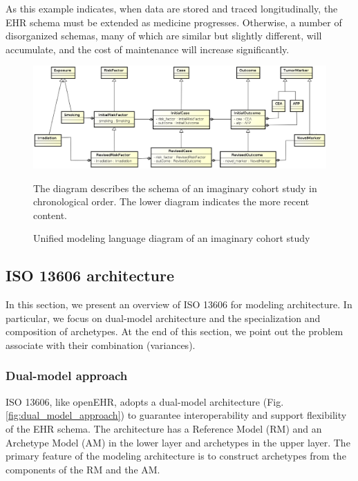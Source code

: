 \documentclass[preprint,3p,onecolumn,times,review]{elsarticle}
\begin{document}
As this example indicates, when data are stored and traced longitudinally, the EHR schema must be extended as medicine progresses. Otherwise, a number of disorganized schemas, many of which are similar but slightly different, will accumulate, and the cost of maintenance will increase significantly.


\begin{figure}[!htbp]
  \begin{center}
    \includegraphics[width=14cm]{cancer_cohort_study_schema.eps}  
  \end{center}
  \caption{Unified modeling language diagram of an imaginary cohort study}\label{fig:cohort_study}
  The diagram describes the schema of an imaginary cohort study in chronological order.
  The lower diagram indicates the more recent content.
\end{figure}

\subsection{ISO 13606 architecture}

In this section, we present an overview of ISO 13606 for modeling architecture.
In particular, we focus on dual-model architecture and the specialization and composition of archetypes.
At the end of this section, we point out the problem associate with their combination (variances).

\subsubsection{Dual-model approach}


ISO 13606, like openEHR, adopts a dual-model architecture (Fig. \ref{fig:dual_model_approach}) to guarantee interoperability and support flexibility of the EHR schema.
The architecture has a Reference Model (RM) and an Archetype Model (AM) in the lower layer and archetypes in the upper layer.
The primary feature of the modeling architecture is to construct archetypes from the components of the RM and the AM.
\end{document}
